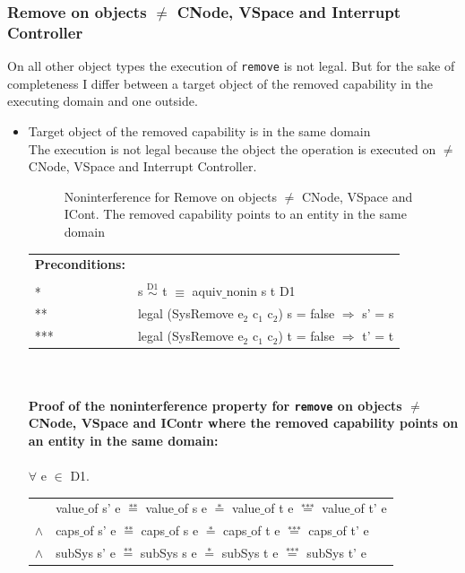 \documentclass[11pt,a4paper,twoside]{article}
\begin{document}
{\subsubsection{Remove on objects $\neq$ CNode, VSpace and Interrupt Controller} 
On all other object types the execution of \texttt{remove} is not legal. But for the sake of completeness I differ between a target object of the removed capability in the executing domain and one outside.
\begin{itemize}
\item Target object of the removed capability is in the same domain \\
The execution is not legal because the object the operation is executed on $\neq$ CNode, VSpace and Interrupt Controller.
\begin{flushleft}
\begin{figure}[H]
\caption{Noninterference for Remove on objects $\neq$ CNode, VSpace and ICont. The removed capability points to an entity in the same domain}
\label{fig:RemoveOthers}
\end{figure}
\end{flushleft}
\begin{tabular}{ll}
\textbf{Preconditions:} \\ \\
* & s $\overset{\text{D1}}{\sim}$ t $\equiv$ aquiv$\_$nonin s t D1	\\ 
** & legal (SysRemove e$_2$ c$_1$ c$_2$) s = false $\Rightarrow$ s' = s \\ 
*** & legal (SysRemove e$_2$ c$_1$ c$_2$) t = false $\Rightarrow$ t' = t
\end{tabular} \\ \\ 
\textbf{Proof of the noninterference property for \texttt{remove} on objects $\neq$ CNode, VSpace and IContr where the removed capability points on an entity in the same domain:}\\ \\
$\forall$ e $\in$ D1. \\
\begin{tabular}{ll}
& value$\_$of s' e $\overset{\text{**}}{=}$ value$\_$of s e $\overset{\text{*}}{=}$ value$\_$of t e $\overset{\text{***}}{=}$ value$\_$of t' e \\
$\wedge$ & caps$\_$of s' e $\overset{\text{**}}{=}$ caps$\_$of s e $\overset{\text{*}}{=}$ caps$\_$of t e $\overset{\text{***}}{=}$ caps$\_$of t' e \\
$\wedge$ & subSys s' e $\overset{\text{**}}{=}$ subSys s e $\overset{\text{*}}{=}$ subSys t e $\overset{\text{***}}{=}$ subSys t' e

\end{tabular}
\end{itemize}}
\end{document}
